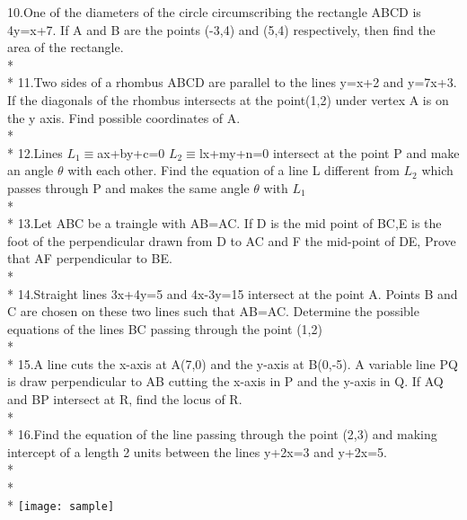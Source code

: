 \documentclass{article}
\begin{document}
{10.\enspace One of the diameters of the circle circumscribing the rectangle ABCD is 4y=x+7. If A and B are the points (-3,4) and (5,4) respectively, then find the area of the rectangle.\\*\\*
11.\enspace Two sides of a rhombus ABCD are parallel to the lines y=x+2 and y=7x+3. If the diagonals of the rhombus intersects at the point(1,2) under vertex A is on the y axis. Find possible coordinates of A.\\*\\*
12.\enspace Lines $L_1\equiv$ax+by+c=0 $L_2\equiv$lx+my+n=0 intersect at the point P and make an angle $\theta$ with each other. Find the equation of a line L different from $L_2$ which passes through P and makes the same angle $\theta$ with $L_1$\\*\\*
13.\enspace Let ABC be a traingle with AB=AC. If D is the mid point of BC,E is the foot of the perpendicular drawn from D to AC and F the mid-point of DE, Prove that AF perpendicular to BE.\\*\\*
14.\enspace Straight lines 3x+4y=5 and 4x-3y=15 intersect at the point A. Points B and C are chosen on these two lines such that AB=AC. Determine the possible equations of the lines BC passing through the point (1,2)\\*\\*
15.\enspace A line cuts the x-axis at A(7,0) and the y-axis at B(0,-5). A variable line PQ is draw perpendicular to AB cutting the x-axis in P and the y-axis in Q. If AQ and BP intersect at R, find the locus of R.\\*\\*
16.\enspace Find the equation of the line passing through the point (2,3) and making intercept of a length 2 units between the lines y+2x=3 and y+2x=5.\\*\\*\\*
\texttt{[image: sample]}

}
\end{document}
